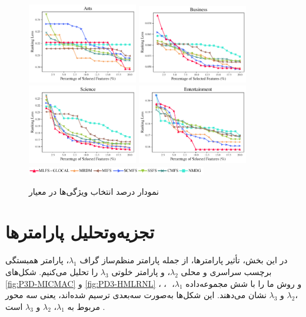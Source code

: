 \begin{figure}
	\centering
	{\includegraphics[width=0.43\textwidth]{figures/Ranking Loss/PSF(Arts).pdf}}
	{\includegraphics[width=0.43\textwidth]{figures/Ranking Loss/PSF(Business).pdf}}
	\\
	{\includegraphics[width=0.43\textwidth]{figures/Ranking Loss/PSF(Science).pdf}}
	{\includegraphics[width=0.43\textwidth]{figures/Ranking Loss/PSF(Entertainment).pdf}}
	{\includegraphics[width=0.7\textwidth]{figures/Micro/FL.pdf}}
	\caption{\BNazTTN نمودار درصد انتخاب ویژگی‌ها در معیار  }
	\label{fig:frnl}
\end{figure}
\section{تجزیه‌و‌تحلیل پارامترها}
در این بخش، تأثیر پارامترها، از جمله پارامتر منظم‌ساز گراف $\lambda_1$، پارامتر همبستگی برچسب سراسری و محلی $\lambda_2$، و پارامتر خلوتی $\lambda_3$ را تحلیل می‌کنیم. شکل‌های \ref{fig:P3D-MICMAC} و \ref{fig:PD3-HMLRNL} ‎‎، ‎‎، ‎ و  روش ما را با شش مجموعه‌داده $\lambda_1$، $\lambda_2،$ و $\lambda_3$ نشان می‌دهند. این شکل‌ها به‌صورت سه‌بعدی ترسیم شده‌اند، یعنی سه محور مربوط به $\lambda_1$، $\lambda_2$ و $\lambda_3$ است \cite{SALAHIAN2023119051}.

